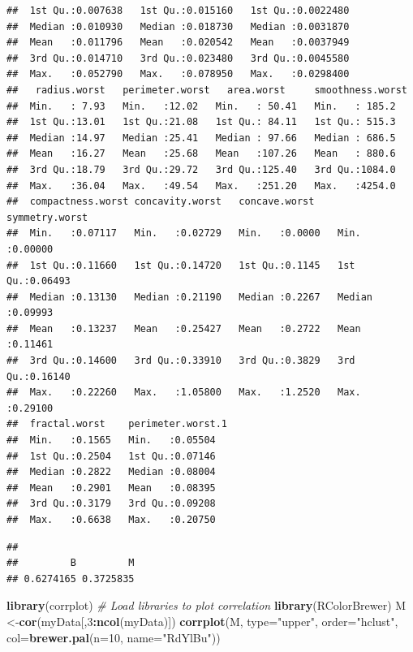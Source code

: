 \documentclass[]{article}
\newenvironment{Shaded}{\begin{snugshade}}{\end{snugshade}}
\newcommand{\CommentTok}[1]{\textcolor[rgb]{0.56,0.35,0.01}{\textit{#1}}}
\newcommand{\DataTypeTok}[1]{\textcolor[rgb]{0.13,0.29,0.53}{#1}}
\newcommand{\DecValTok}[1]{\textcolor[rgb]{0.00,0.00,0.81}{#1}}
\newcommand{\KeywordTok}[1]{\textcolor[rgb]{0.13,0.29,0.53}{\textbf{#1}}}
\newcommand{\NormalTok}[1]{#1}
\newcommand{\OperatorTok}[1]{\textcolor[rgb]{0.81,0.36,0.00}{\textbf{#1}}}
\newcommand{\StringTok}[1]{\textcolor[rgb]{0.31,0.60,0.02}{#1}}
\begin{document}
\begin{verbatim}
##  1st Qu.:0.007638   1st Qu.:0.015160   1st Qu.:0.0022480   
##  Median :0.010930   Median :0.018730   Median :0.0031870   
##  Mean   :0.011796   Mean   :0.020542   Mean   :0.0037949   
##  3rd Qu.:0.014710   3rd Qu.:0.023480   3rd Qu.:0.0045580   
##  Max.   :0.052790   Max.   :0.078950   Max.   :0.0298400   
##   radius.worst   perimeter.worst   area.worst     smoothness.worst
##  Min.   : 7.93   Min.   :12.02   Min.   : 50.41   Min.   : 185.2  
##  1st Qu.:13.01   1st Qu.:21.08   1st Qu.: 84.11   1st Qu.: 515.3  
##  Median :14.97   Median :25.41   Median : 97.66   Median : 686.5  
##  Mean   :16.27   Mean   :25.68   Mean   :107.26   Mean   : 880.6  
##  3rd Qu.:18.79   3rd Qu.:29.72   3rd Qu.:125.40   3rd Qu.:1084.0  
##  Max.   :36.04   Max.   :49.54   Max.   :251.20   Max.   :4254.0  
##  compactness.worst concavity.worst   concave.worst    symmetry.worst   
##  Min.   :0.07117   Min.   :0.02729   Min.   :0.0000   Min.   :0.00000  
##  1st Qu.:0.11660   1st Qu.:0.14720   1st Qu.:0.1145   1st Qu.:0.06493  
##  Median :0.13130   Median :0.21190   Median :0.2267   Median :0.09993  
##  Mean   :0.13237   Mean   :0.25427   Mean   :0.2722   Mean   :0.11461  
##  3rd Qu.:0.14600   3rd Qu.:0.33910   3rd Qu.:0.3829   3rd Qu.:0.16140  
##  Max.   :0.22260   Max.   :1.05800   Max.   :1.2520   Max.   :0.29100  
##  fractal.worst    perimeter.worst.1
##  Min.   :0.1565   Min.   :0.05504  
##  1st Qu.:0.2504   1st Qu.:0.07146  
##  Median :0.2822   Median :0.08004  
##  Mean   :0.2901   Mean   :0.08395  
##  3rd Qu.:0.3179   3rd Qu.:0.09208  
##  Max.   :0.6638   Max.   :0.20750
\end{verbatim}

\begin{Shaded}
\end{Shaded}

\begin{verbatim}
## 
##         B         M 
## 0.6274165 0.3725835
\end{verbatim}

\begin{Shaded}
\begin{Highlighting}[]
\KeywordTok{library}\NormalTok{(corrplot) }\CommentTok{# Load libraries to plot correlation}
\KeywordTok{library}\NormalTok{(RColorBrewer)}
\NormalTok{M <-}\KeywordTok{cor}\NormalTok{(myData[,}\DecValTok{3}\OperatorTok{:}\KeywordTok{ncol}\NormalTok{(myData)])}
\KeywordTok{corrplot}\NormalTok{(M, }\DataTypeTok{type=}\StringTok{"upper"}\NormalTok{, }\DataTypeTok{order=}\StringTok{"hclust"}\NormalTok{, }\DataTypeTok{col=}\KeywordTok{brewer.pal}\NormalTok{(}\DataTypeTok{n=}\DecValTok{10}\NormalTok{, }\DataTypeTok{name=}\StringTok{"RdYlBu"}\NormalTok{))}
\end{Highlighting}
\end{Shaded}
\end{document}
